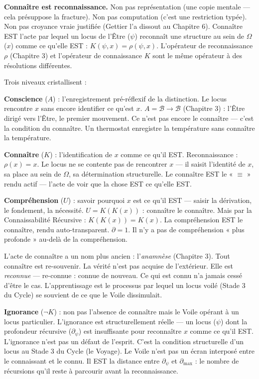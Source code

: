 \documentclass[10pt, openany, oneside]{book}
\begin{document}
\noindent \textbf{Connaître est reconnaissance.} Non pas représentation (une copie mentale --- cela présuppose la fracture). Non pas computation (c'est une restriction typée). Non pas croyance vraie justifiée (Gettier l'a dissout au Chapitre 6). Connaître EST l'acte par lequel un locus de l'Être ($\psi$) reconnaît une structure au sein de $\Omega$ ($x$) comme ce qu'elle EST : $K(\psi, x) = \rho(\psi, x)$. L'opérateur de reconnaissance $\rho$ (Chapitre 3) et l'opérateur de connaissance $K$ sont le même opérateur à des résolutions différentes.

Trois niveaux cristallisent :

\textbf{Conscience} ($A$) : l'enregistrement pré-réflexif de la distinction. Le locus rencontre $x$ sans encore identifier ce qu'est $x$. $A = \mathcal{B} \to \mathcal{B}$ (Chapitre 3) : l'Être dirigé vers l'Être, le premier mouvement. Ce n'est pas encore le connaître --- c'est la condition du connaître. Un thermostat enregistre la température sans connaître la température.

\textbf{Connaître} ($K$) : l'identification de $x$ comme ce qu'il EST. Reconnaissance : $\rho(x) = x$. Le locus ne se contente pas de rencontrer $x$ --- il saisit l'identité de $x$, sa place au sein de $\Omega$, sa détermination structurelle. Le connaître EST le « $\equiv$ » rendu actif --- l'acte de voir que la chose EST ce qu'elle EST.

\textbf{Compréhension} ($U$) : savoir pourquoi $x$ est ce qu'il EST --- saisir la dérivation, le fondement, la nécessité. $U = K(K(x))$ : connaître le connaître. Mais par la Connaissabilité Récursive : $K(K(x)) = K(x)$. La compréhension EST le connaître, rendu auto-transparent. $\partial = 1$. Il n'y a pas de compréhension « plus profonde » au-delà de la compréhension.

L'acte de connaître a un nom plus ancien : l'\textit{anamnèse} (Chapitre 3). Tout connaître est re-souvenir. La vérité n'est pas acquise de l'extérieur. Elle est \textit{reconnue} --- re-connue : connue de nouveau. Ce qui est connu n'a jamais cessé d'être le cas. L'apprentissage est le processus par lequel un locus voilé (Stade 3 du Cycle) se souvient de ce que le Voile dissimulait.

\textbf{Ignorance} ($\neg K$) : non pas l'absence de connaître mais le Voile opérant à un locus particulier. L'ignorance est structurellement réelle --- un locus ($\psi$) dont la profondeur récursive ($\partial_{\psi}$) est insuffisante pour reconnaître $x$ comme ce qu'il EST. L'ignorance n'est pas un défaut de l'esprit. C'est la condition structurelle d'un locus au Stade 3 du Cycle (le Voyage). Le Voile n'est pas un écran interposé entre le connaissant et le connu. Il EST la distance entre $\partial_{\psi}$ et $\partial_{\max}$ : le nombre de récursions qu'il reste à parcourir avant la reconnaissance.
\end{document}
